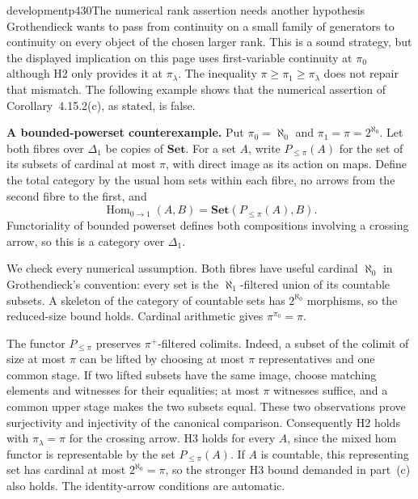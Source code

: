 \begin{dcomment}{development}{p430}{The numerical rank assertion needs another hypothesis}
Grothendieck wants to pass from continuity on a small family of generators to continuity on every object of the chosen larger rank. This is a sound strategy, but the displayed implication on this page uses first-variable continuity at $\pi_0$ although H2 only provides it at $\pi_\lambda$. The inequality $\pi\geq\pi_1\geq\pi_\lambda$ does not repair that mismatch. The following example shows that the numerical assertion of Corollary~4.15.2(c), as stated, is false.

\textbf{A bounded-powerset counterexample.}\ours\quad
Put $\pi_0=\aleph_0$ and $\pi_1=\pi=2^{\aleph_0}$. Let both fibres over $\Delta_1$ be copies of $\mathbf{Set}$. For a set $A$, write $P_{\leq\pi}(A)$ for the set of its subsets of cardinal at most $\pi$, with direct image as its action on maps. Define the total category by the usual hom sets within each fibre, no arrows from the second fibre to the first, and
\[
 \operatorname{Hom}_{0\to1}(A,B)
       =\mathbf{Set}(P_{\leq\pi}(A),B).
\]
Functoriality of bounded powerset defines both compositions involving a crossing arrow, so this is a category over $\Delta_1$.

We check every numerical assumption. Both fibres have useful cardinal $\aleph_0$ in Grothendieck's convention: every set is the $\aleph_1$-filtered union of its countable subsets. A skeleton of the category of countable sets has $2^{\aleph_0}$ morphisms, so the reduced-size bound holds. Cardinal arithmetic gives $\pi^{\pi_0}=\pi$.

The functor $P_{\leq\pi}$ preserves $\pi^+$-filtered colimits. Indeed, a subset of the colimit of size at most $\pi$ can be lifted by choosing at most $\pi$ representatives and one common stage. If two lifted subsets have the same image, choose matching elements and witnesses for their equalities; at most $\pi$ witnesses suffice, and a common upper stage makes the two subsets equal. These two observations prove surjectivity and injectivity of the canonical comparison. Consequently H2 holds with $\pi_\lambda=\pi$ for the crossing arrow. H3 holds for every $A$, since the mixed hom functor is representable by the set $P_{\leq\pi}(A)$. If $A$ is countable, this representing set has cardinal at most $2^{\aleph_0}=\pi$, so the stronger H3 bound demanded in part~(c) also holds. The identity-arrow conditions are automatic.


\end{dcomment}
